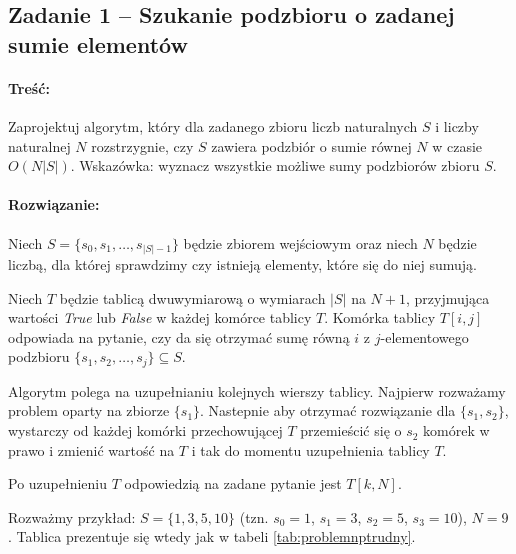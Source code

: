 \subsection{Zadanie 1 -- Szukanie podzbioru o zadanej sumie elementów}

\paragraph{Treść: } Zaprojektuj algorytm, który dla zadanego zbioru 
liczb naturalnych $S$ i liczby naturalnej $N$ rozstrzygnie,
czy $S$ zawiera podzbiór o sumie równej $N$ w czasie $O(N |S|)$.
Wskazówka: wyznacz wszystkie możliwe sumy podzbiorów zbioru $S$.

\paragraph{Rozwiązanie: } Niech $S = \{s_0, s_1, \dots, s_{|S| - 1}\}$ będzie zbiorem wejściowym oraz 
niech $N$ będzie liczbą, dla której sprawdzimy czy istnieją elementy, które się do niej sumują.

Niech $T$ będzie tablicą dwuwymiarową o wymiarach $|S|$ na $N + 1$, przyjmująca wartości 
\textit{True} lub \textit{False} w każdej komórce tablicy $T$.
Komórka tablicy $T[i, j]$ odpowiada na pytanie, czy da się otrzymać 
sumę równą $i$ z $j$-elementowego podzbioru $\{s_1, s_2, \dots, s_j\} \subseteq S$.

Algorytm polega na uzupełnianiu kolejnych wierszy tablicy.
Najpierw rozważamy problem oparty na zbiorze $\{s_1\}$. 
Nastepnie aby otrzymać rozwiązanie dla $\{s_1, s_2\}$, wystarczy
od każdej komórki przechowującej $T$ przemieścić się o $s_2$ komórek w prawo
i zmienić wartość na $T$ i tak do momentu uzupełnienia tablicy $T$.

Po uzupełnieniu $T$ odpowiedzią na zadane pytanie jest $T[k, N]$.

Rozważmy przykład: $S = \{1, 3, 5, 10\}$ (tzn. $s_0=1$, $s_1=3$, $s_2=5$, $s_3=10$), 
$N = 9$. Tablica prezentuje się wtedy jak w tabeli \ref{tab:problemnptrudny}.

